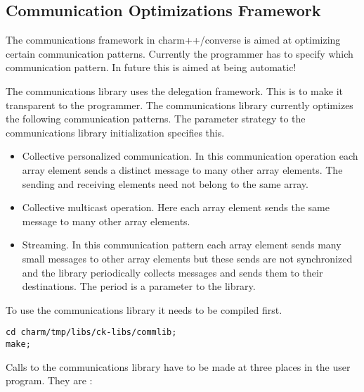 \subsection{Communication Optimizations Framework}

The communications framework in charm++/converse is aimed at
optimizing certain communication patterns. Currently the programmer
has to specify which communication pattern. In future this is aimed at
being automatic!

The communications library uses the delegation framework. This is to
make it transparent to the programmer. The communications library
currently optimizes the following communication patterns. The
parameter strategy to the communications library initialization
specifies this.

\begin{itemize} 
\item Collective personalized communication. In this
communication operation each array element sends a distinct message to
many other array elements. The sending and receiving elements need not
belong to the same array.  

\item Collective multicast operation. Here
each array element sends the same message to many other array
elements.  

\item Streaming. In this communication pattern each array
element sends many small messages to other array elements but these
sends are not synchronized and the library periodically collects
messages and sends them to their destinations. The period is a
parameter to the library.

\end{itemize}

To use the communications library it needs to be compiled first.

\begin{verbatim}
cd charm/tmp/libs/ck-libs/commlib;
make;
\end{verbatim}

Calls to the communications library have to be made at three places in
the user program. They are :

